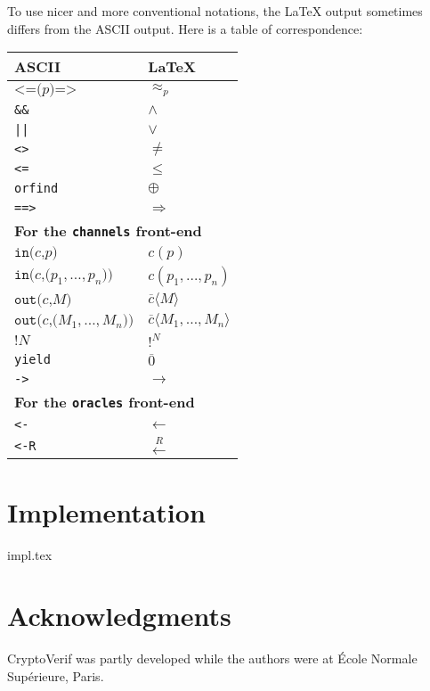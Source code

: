 \documentclass{article}
\begin{document}
To use nicer and more conventional notations, the {\LaTeX} output sometimes
differs from the ASCII output. Here is a table of correspondence:
\begin{center}
\begin{tabular}{l|l}
ASCII&{\LaTeX}\\
\hline
$\texttt{<=(}p\texttt{)=>}$& $\approx_p$\\
\texttt{\&\&}&$\wedge$\\
\texttt{||}&$\vee$\\
\texttt{<>}&$\neq$\\
\texttt{<=}&$\leq$\\
\texttt{orfind}&$\oplus$\\
\texttt{==>}&$\Longrightarrow$\\
\hline
\multicolumn{2}{l}{\textbf{For the \texttt{channels} front-end}}\\
\hline
$\texttt{in(}c\texttt{,}p\texttt{)}$& $c(p)$\\
$\texttt{in(}c\texttt{,(}p_1, \ldots, p_n\texttt{))}$& $c(p_1, \ldots, p_n)$\\
$\texttt{out(}c\texttt{,}M\texttt{)}$& $\overline{c}\langle M\rangle$\\
$\texttt{out(}c\texttt{,(}M_1, \ldots, M_n\texttt{))}$& $\overline{c}\langle M_1, \ldots, M_n\rangle$\\
$\texttt{!}N$&$!^N$\\
\texttt{yield}& $\overline{0}$\\
\texttt{->}& $\rightarrow$\\
\hline
\multicolumn{2}{l}{\textbf{For the \texttt{oracles} front-end}}\\
\hline
\texttt{<-}&$\leftarrow$\\
\texttt{<-R}&$\stackrel{R}{\leftarrow}$\\
\end{tabular}
\end{center}

\section{Implementation}
 {impl.tex}



\section*{Acknowledgments}

CryptoVerif was partly developed while the authors were at \'Ecole Normale Sup\'erieure, Paris.


\end{document}
